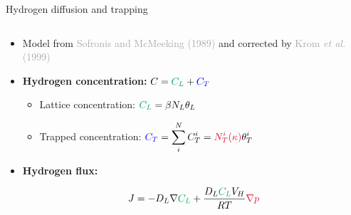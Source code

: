 \documentclass[9pt]{beamer}
\begin{document}

\begin{frame}{Hydrogen diffusion and trapping}

    \begin{columns}
    
        \begin{column}{0.8\textwidth}
    
            \begin{itemize}
                \item Model from \textcolor{darkgray}{Sofronis and McMeeking (1989)} and corrected by \textcolor{darkgray}{Krom \textit{et al.} (1999)}
                
                \vspace{0.35cm}
            
                \item \textbf{Hydrogen concentration:} \hspace{0.5cm} $ \displaystyle C = \textcolor{DarkGreen}{C_L} + \textcolor{blue}{C_T}$
    
                \begin{itemize}
                    \vspace{0.35cm}
                    \item Lattice concentration: \hspace{1.0cm} $\displaystyle \textcolor{DarkGreen}{C_L} = \beta N_L \theta_L$
                    
                    \vspace{0.35cm}
        
                    \item Trapped concentration: \hspace{0.1cm} $\displaystyle \textcolor{blue}{C_T} = \sum_i^N C_T^i = \textcolor{NewRed}{N_T^i(\kappa)} \theta_T^i$
    
                \end{itemize}
    
                \vspace{0.35cm}
    
                \item \textbf{Hydrogen flux:}
    
                \begin{equation*}
                    J = -D_L \nabla \textcolor{DarkGreen}{C_L} + \frac{D_L \textcolor{DarkGreen}{C_L} V_H}{RT} \textcolor{NewRed}{\nabla p}
                \end{equation*}
            

\end{itemize}
\end{column}
\end{columns}
\end{frame}
\end{document}
